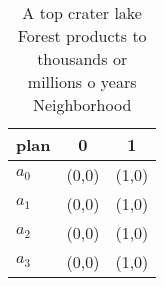 \documentclass[a4paper]{article}
\begin{document}
\begin{table}
\begin{adjustbox}{width=0.5\columnwidth}
\begin{tabular}{|l|l|l|}
\hline
\textbf{plan} & \multicolumn{1}{c|}{\textbf{0}} & \multicolumn{1}{c|}{\textbf{1}} \\ \hline
\textbf{$a_0$}  & (0,0) & (1,0) \\ \hline
\textbf{$a_1$}  & (0,0) & (1,0) \\ \hline
\textbf{$a_2$}  & (0,0) & (1,0) \\ \hline
\textbf{$a_3$}  & (0,0) & (1,0) \\ \hline
\end{tabular}
\end{adjustbox}
\caption{A top crater lake Forest products to thousands or millions o years Neighborhood
}
\end{table}
\end{document}

